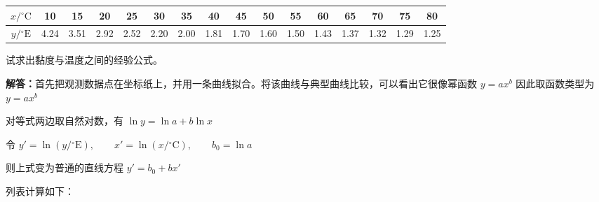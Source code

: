 \documentclass[UTF8,zihao=-4]{ctexart}
\newcommand{\jieda}{\noindent\textbf{解答：}}
\begin{document}
\begin{center}
\scriptsize
\setlength{\tabcolsep}{4.5pt}
\begin{tabular}{c|ccccccccccccccc}
\toprule
$x/{}^\circ\mathrm{C}$ & 10 & 15 & 20 & 25 & 30 & 35 & 40 & 45 & 50 & 55 & 60 & 65 & 70 & 75 & 80\\
\midrule
$y/{}^\circ\mathrm{E}$ & 4.24 & 3.51 & 2.92 & 2.52 & 2.20 & 2.00 & 1.81 & 1.70 & 1.60 & 1.50 & 1.43 & 1.37 & 1.32 & 1.29 & 1.25\\
\bottomrule
\end{tabular}
\end{center}

试求出黏度与温度之间的经验公式。

\jieda 首先把观测数据点在坐标纸上，并用一条曲线拟合。将该曲线与典型曲线比较，可以看出它很像幂函数 $y=ax^b$ 因此取函数类型为 $y=ax^b$

对等式两边取自然对数，有 $\ln y=\ln a+b\ln x$

令 $y'=\ln(y/{}^\circ\mathrm{E}), \qquad x'=\ln(x/{}^\circ\mathrm{C}), \qquad b_0=\ln a$

则上式变为普通的直线方程 $y'=b_0+bx'$

列表计算如下：
\end{document}
